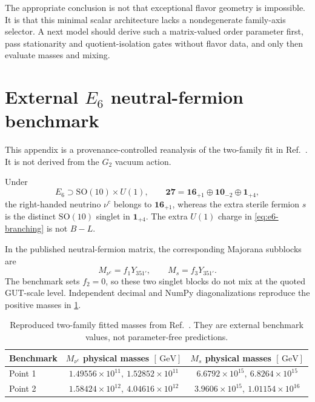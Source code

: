 \documentclass[11pt]{article}
\newcommand{\SO}{\mathrm{SO}}
\newcommand{\GeV}{\,\mathrm{GeV}}
\begin{document}
The appropriate conclusion is not that exceptional flavor geometry is impossible.  It is that this minimal scalar architecture lacks a nondegenerate family-axis selector.  A next model should derive such a matrix-valued order parameter first, pass stationarity and quotient-isolation gates without flavor data, and only then evaluate masses and mixing.

\appendix
\section{External $E_6$ neutral-fermion benchmark}
\label{app:e6}

This appendix is a provenance-controlled reanalysis of the two-family fit in Ref.~\cite{BabuBajcSusic2015}.  It is not derived from the $G_2$ vacuum action.

Under
\begin{equation}
 E_6\supset \SO(10)\times U(1),\qquad
 \mathbf{27}=\mathbf{16}_{+1}\oplus\mathbf{10}_{-2}\oplus\mathbf{1}_{+4},
 \label{eq:e6-branching}
\end{equation}
the right-handed neutrino $\nu^c$ belongs to $\mathbf{16}_{+1}$, whereas the extra sterile fermion $s$ is the distinct $\SO(10)$ singlet in $\mathbf{1}_{+4}$.  The extra $U(1)$ charge in \cref{eq:e6-branching} is not $B-L$.

In the published neutral-fermion matrix, the corresponding Majorana subblocks are
\begin{equation}
  M_{\nu^c}=f_1Y_{351'},\qquad M_s=f_3Y_{351'}.
  \label{eq:e6-masses}
\end{equation}
The benchmark sets $f_2=0$, so these two singlet blocks do not mix at the quoted GUT-scale level.  Independent decimal and NumPy diagonalizations reproduce the positive masses in \cref{tab:e6-masses}.

\begin{table}[h]
\centering
\caption{Reproduced two-family fitted masses from Ref.~\cite{BabuBajcSusic2015}.  They are external benchmark values, not parameter-free predictions.}
\label{tab:e6-masses}
\begin{tabular}{@{}lcc@{}}
\toprule
Benchmark & $M_{\nu^c}$ physical masses $[\GeV]$ & $M_s$ physical masses $[\GeV]$ \\
\midrule
Point 1 & $1.49556\times10^{11},\ 1.52852\times10^{11}$
        & $6.6792\times10^{15},\ 6.8264\times10^{15}$ \\
Point 2 & $1.58424\times10^{12},\ 4.04616\times10^{12}$
        & $3.9606\times10^{15},\ 1.01154\times10^{16}$ \\
\bottomrule
\end{tabular}
\end{table}
\end{document}
